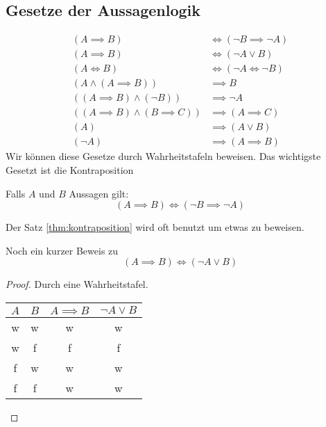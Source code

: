 \subsection{Gesetze der Aussagenlogik}
\begin{align*}
	(A \implies B) &\iff (\neg B \implies \neg A) \\
	(A \implies B) &\iff (\neg A \vee B) \\
	(A \iff B) &\iff (\neg A \iff \neg B) \\
	(A \wedge (A \implies B)) &\implies B \\
	((A\implies B) \wedge (\neg B)) &\implies \neg A \\
	((A \implies B) \wedge (B \implies C)) &\implies (A \implies C) \\
	(A) &\implies (A \vee B)\\
	(\neg A) &\implies (A \implies B)
\end{align*}
Wir können diese Gesetze durch Wahrheitstafeln beweisen. Das wichtigste Gesetzt ist die Kontraposition
\begin{theorem}[Kontraposition]
	\label{thm:kontraposition}
Falls $A$ und $B$ Aussagen gilt:
\[
	(A \implies B) \iff (\neg B \implies \neg A)
\]
\end{theorem}
\begin{remark}
Der Satz \ref{thm:kontraposition} wird oft benutzt um etwas zu beweisen. 
\end{remark}
Noch ein kurzer Beweis zu 
\[
	(A \implies B) \iff (\neg A \vee B)
\]
\begin{proof}
Durch eine Wahrheitstafel.
\begin{table}[htpb]
	\centering
	\begin{tabular}{c|c|c|c}
		$A$ & $B$ & $A \implies B$ & $\neg A \vee B$ \\
		\hline
		w & w & w & w \\
		w & f & f & f \\
		f & w & w & w \\
		f & f & w & w
	\end{tabular}
\end{table}
\end{proof}
